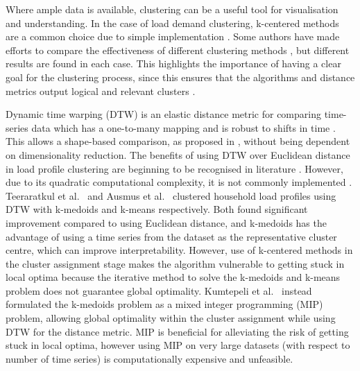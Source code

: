 Where ample data is available, clustering can be a useful tool for visualisation and understanding. In the case of load demand clustering, k-centered methods are a common choice due to simple implementation \cite{Yilmaz2019ComparisonManagement}. Some authors have made efforts to compare the effectiveness of different clustering methods \cite{Rajabi2020ASegmentation, Wang2015LoadReview, McLoughlin2015AData}, but different results are found in each case. This highlights the importance of having a clear goal for the clustering process, since this ensures that the algorithms and distance metrics output logical and relevant clusters \cite{VonLuxburg2012Clustering:Art, Hennig2015WhatClusters}. 

Dynamic time warping (DTW) is an elastic distance metric for comparing time-series data which has a one-to-many mapping and is robust to shifts in time \cite{Sakoe1978DynamicRecognition}. This allows a shape-based comparison, as proposed in \cite{Lin2019ClusteringApplications}, without being dependent on dimensionality reduction. The benefits of using DTW over Euclidean distance in load profile clustering are beginning to be recognised in literature \cite{Aghabozorgi2015Time-seriesReview, Ausmus2020ImprovingWarping, Begum2015AcceleratingStrategy, Ratanamahatana2005ThreeMining}. However, due to its quadratic computational complexity, it is not commonly implemented \cite{Rajabi2020ASegmentation}. Teeraratkul et al.\ \cite{Teeraratkul2016CondensedDemand} and Ausmus et al.\ \cite{Ausmus2020ImprovingWarping} clustered household load profiles using DTW with k-medoids and k-means respectively. Both found significant improvement compared to using Euclidean distance, and k-medoids has the advantage of using a time series from the dataset as the representative cluster centre, which can improve interpretability. However, use of k-centered methods in the cluster assignment stage makes the algorithm vulnerable to getting stuck in local optima because the iterative method to solve the k-medoids and k-means problem does not guarantee global optimality. Kumtepeli et al.\ \cite{Kumtepeli2024DTW-C++:Data} instead formulated the k-medoids problem as a mixed integer programming (MIP) problem, allowing global optimality within the cluster assignment while using DTW for the distance metric. MIP is beneficial for alleviating the risk of getting stuck in local optima, however using MIP on very large datasets (with respect to number of time series) is computationally expensive and unfeasible. 

